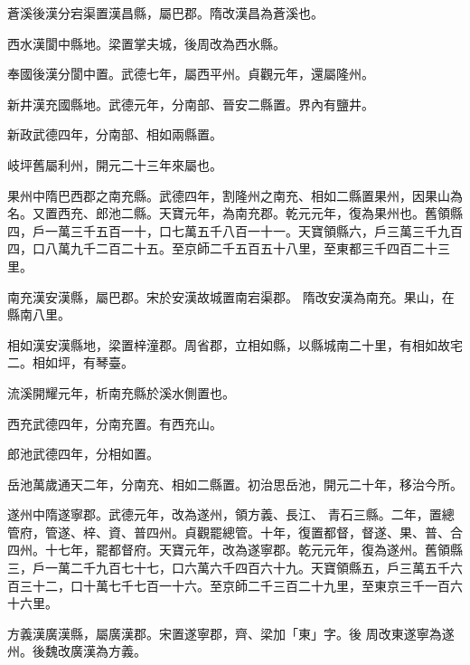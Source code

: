 \begin{pinyinscope}
 蒼溪後漢分宕渠置漢昌縣，屬巴郡。隋改漢昌為蒼溪也。



 西水漢閬中縣地。梁置掌夫城，後周改為西水縣。



 奉國後漢分閬中置。武德七年，屬西平州。貞觀元年，還屬隆州。



 新井漢充國縣地。武德元年，分南部、晉安二縣置。界內有鹽井。



 新政武德四年，分南部、相如兩縣置。



 岐坪舊屬利州，開元二十三年來屬也。



 果州中隋巴西郡之南充縣。武德四年，割隆州之南充、相如二縣置果州，因果山為名。又置西充、郎池二縣。天寶元年，為南充郡。乾元元年，復為果州也。舊領縣四，戶一萬三千五百一十，口七萬五千八百一十一。天寶領縣六，戶三萬三千九百四，口八萬九千二百二十五。至京師二千五百五十八里，至東都三千四百二十三里。



 南充漢安漢縣，屬巴郡。宋於安漢故城置南宕渠郡。
 隋改安漢為南充。果山，在縣南八里。



 相如漢安漢縣地，梁置梓潼郡。周省郡，立相如縣，以縣城南二十里，有相如故宅二。相如坪，有琴臺。



 流溪開耀元年，析南充縣於溪水側置也。



 西充武德四年，分南充置。有西充山。



 郎池武德四年，分相如置。



 岳池萬歲通天二年，分南充、相如二縣置。初治思岳池，開元二十年，移治今所。



 遂州中隋遂寧郡。武德元年，改為遂州，領方義、長江、
 青石三縣。二年，置總管府，管遂、梓、資、普四州。貞觀罷總管。十年，復置都督，督遂、果、普、合四州。十七年，罷都督府。天寶元年，改為遂寧郡。乾元元年，復為遂州。舊領縣三，戶一萬二千九百七十七，口六萬六千四百六十九。天寶領縣五，戶三萬五千六百三十二，口十萬七千七百一十六。至京師二千三百二十九里，至東京三千一百六十六里。



 方義漢廣漢縣，屬廣漢郡。宋置遂寧郡，齊、梁加「東」字。後
 周改東遂寧為遂州。後魏改廣漢為方義。




\end{pinyinscope}
